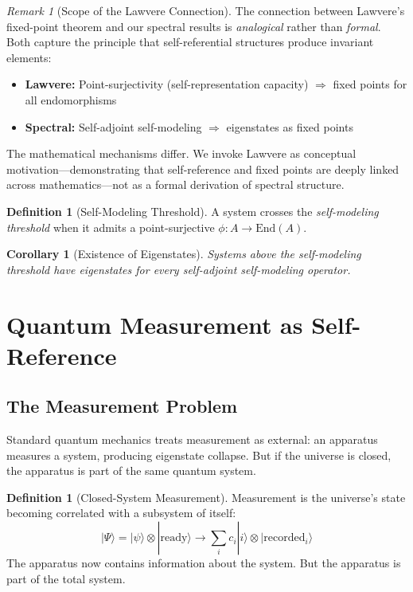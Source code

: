 \documentclass[11pt]{article}
\newtheorem{corollary}[theorem]{Corollary}
\theoremstyle{definition}
\newtheorem{definition}[theorem]{Definition}
\theoremstyle{remark}
\newtheorem{remark}[theorem]{Remark}
\begin{document}
\begin{remark}[Scope of the Lawvere Connection]\label{rem:lawvere_scope}
The connection between Lawvere's fixed-point theorem and our spectral results is \emph{analogical} rather than \emph{formal}. Both capture the principle that self-referential structures produce invariant elements:
\begin{itemize}
    \item \textbf{Lawvere:} Point-surjectivity (self-representation capacity) $\Rightarrow$ fixed points for all endomorphisms
    \item \textbf{Spectral:} Self-adjoint self-modeling $\Rightarrow$ eigenstates as fixed points
\end{itemize}

The mathematical mechanisms differ. We invoke Lawvere as conceptual motivation---demonstrating that self-reference and fixed points are deeply linked across mathematics---not as a formal derivation of spectral structure.
\end{remark}

\begin{definition}[Self-Modeling Threshold]
A system crosses the \emph{self-modeling threshold} when it admits a point-surjective $\phi : A \to \text{End}(A)$.
\end{definition}

\begin{corollary}[Existence of Eigenstates]
Systems above the self-modeling threshold have eigenstates for every self-adjoint self-modeling operator.
\end{corollary}

\section{Quantum Measurement as Self-Reference}

\subsection{The Measurement Problem}

Standard quantum mechanics treats measurement as external: an apparatus measures a system, producing eigenstate collapse. But if the universe is closed, the apparatus is part of the same quantum system.

\begin{definition}[Closed-System Measurement]
Measurement is the universe's state becoming correlated with a subsystem of itself:
\[
|\Psi\rangle = |\psi\rangle \otimes |\text{ready}\rangle \to \sum_i c_i |i\rangle \otimes |\text{recorded}_i\rangle
\]
The apparatus now contains information about the system. But the apparatus is part of the total system.
\end{definition}
\end{document}
